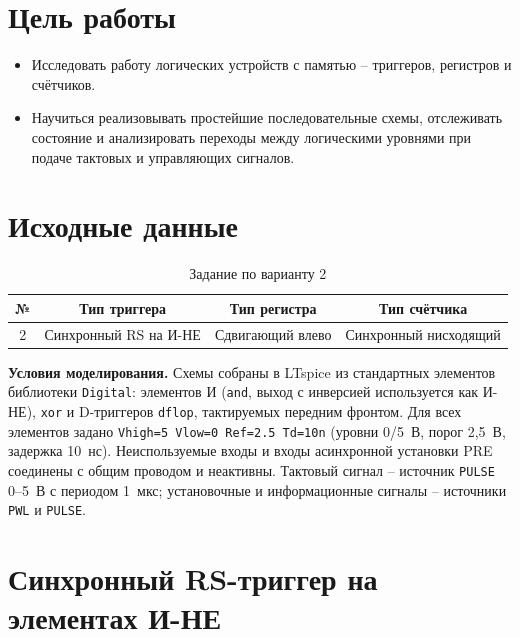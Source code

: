 \documentclass[14pt]{extarticle}
\begin{document}

\tableofcontents
\newpage

\section*{Цель работы}
\begin{itemize}
\item Исследовать работу логических устройств с памятью -- триггеров, регистров и счётчиков.
\item Научиться реализовывать простейшие последовательные схемы, отслеживать состояние и
анализировать переходы между логическими уровнями при подаче тактовых и управляющих сигналов.
\end{itemize}

\section*{Исходные данные}
\begin{table}[H]
\caption{Задание по варианту 2}\label{tab:var}
\centering
\small\begin{tabular}{cccc}
\toprule
№ & Тип триггера & Тип регистра & Тип счётчика\\
\midrule
2 & Синхронный RS на И-НЕ & Сдвигающий влево & Синхронный нисходящий\\
\bottomrule
\end{tabular}
\end{table}

\textbf{Условия моделирования.} Схемы собраны в LTspice из стандартных элементов библиотеки
\texttt{Digital}: элементов И (\texttt{and}, выход с инверсией используется как И-НЕ),
\texttt{xor} и D-триггеров \texttt{dflop}, тактируемых передним фронтом. Для всех элементов
задано \texttt{Vhigh=5 Vlow=0 Ref=2.5 Td=10n} (уровни 0/5~В, порог 2,5~В, задержка 10~нс).
Неиспользуемые входы и входы асинхронной установки PRE соединены с общим проводом и
неактивны. Тактовый сигнал -- источник \texttt{PULSE} 0--5~В с периодом 1~мкс;
установочные и информационные сигналы -- источники \texttt{PWL} и \texttt{PULSE}.

\section{Синхронный RS-триггер на элементах И-НЕ}
\end{document}
